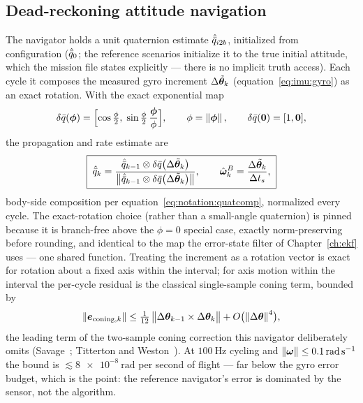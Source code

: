 \subsection{Dead-reckoning attitude navigation}
\label{sec:gnc:deadreckoning}

The navigator holds a unit quaternion estimate
$\hat{\bar{q}}_{i2b}$, initialized from configuration
($\hat{\bar{q}}_0$; the reference scenarios initialize it to the true
initial attitude, which the mission file states explicitly --- there is
no implicit truth access). Each cycle it composes the measured gyro
increment $\Delta\tilde{\bm{\theta}}_k$
(equation~\eqref{eq:imu:gyro}) as an exact rotation. With the exact
exponential map
\begin{equation}
  \delta\bar{q}(\bm{\phi}) =
    \Bigl[\cos\tfrac{\phi}{2},\;
      \sin\tfrac{\phi}{2}\,\frac{\bm{\phi}}{\phi}\Bigr],
  \qquad \phi = \left\lVert \bm{\phi} \right\rVert,
  \qquad
  \delta\bar{q}(\bm{0}) = [1, \bm{0}],
  \label{eq:gnc:exactrot}
\end{equation}
the propagation and rate estimate are
\begin{equation}
  \boxed{\;
  \hat{\bar{q}}_{k} = \frac{\hat{\bar{q}}_{k-1} \otimes
      \delta\bar{q}\bigl(\Delta\tilde{\bm{\theta}}_k\bigr)}
    {\bigl\lVert \hat{\bar{q}}_{k-1} \otimes
      \delta\bar{q}\bigl(\Delta\tilde{\bm{\theta}}_k\bigr)
      \bigr\rVert},
  \qquad
  \hat{\bm{\omega}}_k^{B} =
    \frac{\Delta\tilde{\bm{\theta}}_k}{\Delta t_s} ,
  \;}
  \label{eq:gnc:drprop}
\end{equation}
body-side composition per equation~\eqref{eq:notation:quatcomp},
normalized every cycle. The exact-rotation choice (rather than a
small-angle quaternion) is pinned because it is branch-free above the
$\phi = 0$ special case, exactly norm-preserving before rounding, and
identical to the map the error-state filter of Chapter~\ref{ch:ekf}
uses --- one shared function. Treating the increment as a rotation
vector is exact for rotation about a fixed axis within the interval;
for axis motion within the interval the per-cycle residual is the
classical single-sample coning term, bounded by
\begin{equation}
  \left\lVert \bm{e}_{\mathrm{coning},k} \right\rVert
    \le \tfrac{1}{12}\,
      \bigl\lVert \Delta\bm{\theta}_{k-1} \times \Delta\bm{\theta}_k
      \bigr\rVert
      + O\bigl(\left\lVert \Delta\bm{\theta} \right\rVert^4\bigr),
  \label{eq:gnc:coningbound}
\end{equation}
the leading term of the two-sample coning correction this navigator
deliberately omits (Savage~\cite{savage1998a}; Titterton and
Weston~\cite{titterton2004}). At $\qty{100}{\hertz}$ cycling and
$\left\lVert \bm{\omega} \right\rVert \le \qty{0.1}{\radian\per\second}$ the bound is
$\lesssim \qty{8e-8}{\radian}$ per second of flight --- far below the
gyro error budget, which is the point: the reference navigator's error
is dominated by the sensor, not the algorithm.

